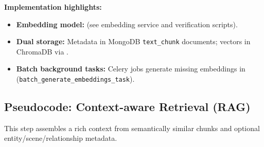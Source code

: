 \textbf{Implementation highlights:}
\begin{itemize}
    \item \textbf{Embedding model:} \texttt{} (see embedding service and verification scripts).
    \item \textbf{Dual storage:} Metadata in MongoDB \texttt{text\_chunk} documents; vectors in ChromaDB via \texttt{}.
    \item \textbf{Batch background tasks:} Celery jobs generate missing embeddings in \texttt{} (\texttt{batch\_generate\_embeddings\_task}).
\end{itemize}

\subsection{Pseudocode: Context-aware Retrieval (RAG)}

This step assembles a rich context from semantically similar chunks and optional entity/scene/relationship metadata.

